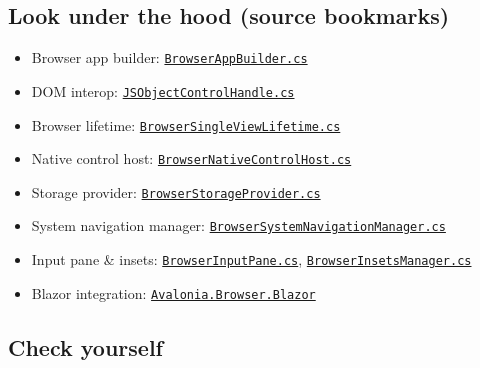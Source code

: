 \subsection{Look under the hood (source
bookmarks)}\label{look-under-the-hood-source-bookmarks-18}

\begin{itemize}
\tightlist
\item
  Browser app builder:
  \href{https://github.com/AvaloniaUI/Avalonia/blob/master/src/Browser/Avalonia.Browser/BrowserAppBuilder.cs}{\passthrough{\lstinline!BrowserAppBuilder.cs!}}
\item
  DOM interop:
  \href{https://github.com/AvaloniaUI/Avalonia/blob/master/src/Browser/Avalonia.Browser/Interop/JSObjectControlHandle.cs}{\passthrough{\lstinline!JSObjectControlHandle.cs!}}
\item
  Browser lifetime:
  \href{https://github.com/AvaloniaUI/Avalonia/blob/master/src/Browser/Avalonia.Browser/BrowserSingleViewLifetime.cs}{\passthrough{\lstinline!BrowserSingleViewLifetime.cs!}}
\item
  Native control host:
  \href{https://github.com/AvaloniaUI/Avalonia/blob/master/src/Browser/Avalonia.Browser/BrowserNativeControlHost.cs}{\passthrough{\lstinline!BrowserNativeControlHost.cs!}}
\item
  Storage provider:
  \href{https://github.com/AvaloniaUI/Avalonia/blob/master/src/Browser/Avalonia.Browser/Storage/BrowserStorageProvider.cs}{\passthrough{\lstinline!BrowserStorageProvider.cs!}}
\item
  System navigation manager:
  \href{https://github.com/AvaloniaUI/Avalonia/blob/master/src/Browser/Avalonia.Browser/BrowserSystemNavigationManager.cs}{\passthrough{\lstinline!BrowserSystemNavigationManager.cs!}}
\item
  Input pane \& insets:
  \href{https://github.com/AvaloniaUI/Avalonia/blob/master/src/Browser/Avalonia.Browser/BrowserInputPane.cs}{\passthrough{\lstinline!BrowserInputPane.cs!}},
  \href{https://github.com/AvaloniaUI/Avalonia/blob/master/src/Browser/Avalonia.Browser/BrowserInsetsManager.cs}{\passthrough{\lstinline!BrowserInsetsManager.cs!}}
\item
  Blazor integration:
  \href{https://github.com/AvaloniaUI/Avalonia/tree/master/src/Browser/Avalonia.Browser.Blazor}{\passthrough{\lstinline!Avalonia.Browser.Blazor!}}
\end{itemize}

\subsection{Check yourself}\label{check-yourself-18}

